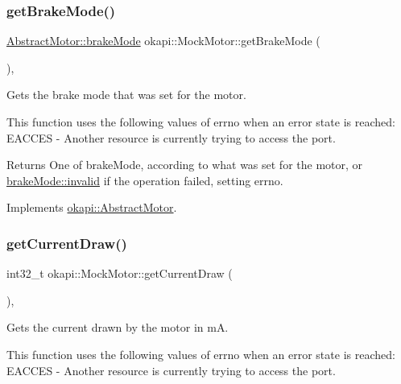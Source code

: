\subsubsection{\texorpdfstring{getBrakeMode()}{getBrakeMode()}}
{\footnotesize\ttfamily \mbox{\hyperlink{classokapi_1_1AbstractMotor_a132e0485dbb59a60c3f934338d8fa601}{Abstract\+Motor\+::brake\+Mode}} okapi\+::\+Mock\+Motor\+::get\+Brake\+Mode (\begin{DoxyParamCaption}{ }\end{DoxyParamCaption})\hspace{0.3cm}{\ttfamily [override]}, {\ttfamily [virtual]}}



Gets the brake mode that was set for the motor. 

This function uses the following values of errno when an error state is reached\+: E\+A\+C\+C\+ES -\/ Another resource is currently trying to access the port.

\begin{DoxyReturn}{Returns}
One of brake\+Mode, according to what was set for the motor, or \mbox{\hyperlink{classokapi_1_1AbstractMotor_a132e0485dbb59a60c3f934338d8fa601afedb2d84cafe20862cb4399751a8a7e3}{brake\+Mode\+::invalid}} if the operation failed, setting errno. 
\end{DoxyReturn}


Implements \mbox{\hyperlink{classokapi_1_1AbstractMotor_a157407c39c952a7c2eb497bddb868c93}{okapi\+::\+Abstract\+Motor}}.

\mbox{\label{classokapi_1_1MockMotor_a907f0f9dd292b8685581be6989588430}} 
\subsubsection{\texorpdfstring{getCurrentDraw()}{getCurrentDraw()}}
{\footnotesize\ttfamily int32\+\_\+t okapi\+::\+Mock\+Motor\+::get\+Current\+Draw (\begin{DoxyParamCaption}{ }\end{DoxyParamCaption})\hspace{0.3cm}{\ttfamily [override]}, {\ttfamily [virtual]}}



Gets the current drawn by the motor in mA. 

This function uses the following values of errno when an error state is reached\+: E\+A\+C\+C\+ES -\/ Another resource is currently trying to access the port.

